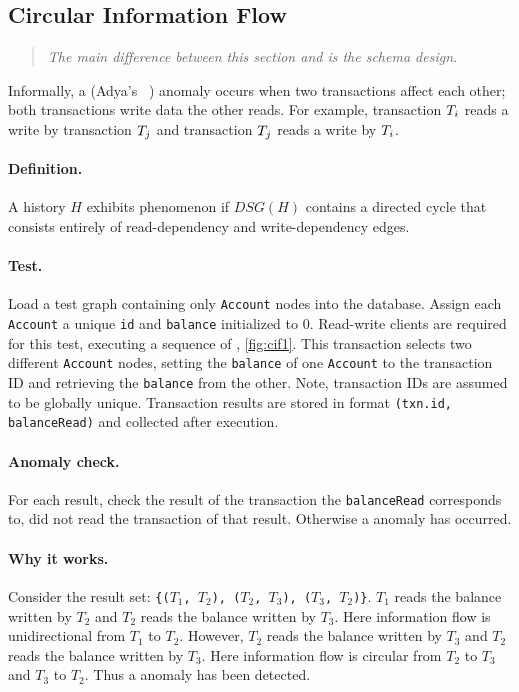 \subsection*{Circular Information Flow}

\begin{quote}
  \textit{The main difference between this section and \ldbcsnb\xspace
          is the schema design.
  }
\end{quote}

Informally, a  (Adya's ~\cite{adya1999weak})
anomaly occurs when two transactions affect each other; \ie both transactions
write data the other reads. For example, transaction $T_i$ reads a 
write by transaction $T_j$ and transaction $T_j$ reads a write by $T_i$.

\paragraph{Definition.}
A history $H$ exhibits phenomenon  if $\textit{DSG}(H)$ contains a 
directed cycle that consists entirely of read-dependency and write-dependency edges.

\paragraph{Test.}
Load a test graph containing only \texttt{Account} nodes into the database.
Assign each \texttt{Account} a unique \texttt{id} and \texttt{balance} 
initialized to 0. Read-write clients are required for this test, executing a 
sequence of , \autoref{fig:cif1}. This transaction 
selects two different \texttt{Account} nodes, setting the \texttt{balance} of 
one \texttt{Account} to the transaction ID and retrieving the \texttt{balance} 
from the other. Note, transaction IDs are assumed to be globally unique. 
Transaction results are stored in format \texttt{(txn.id, balanceRead)} and 
collected after execution.

\paragraph{Anomaly check.}
For each result, check the result of the transaction the \texttt{balanceRead} 
corresponds to, did not read the transaction of that result. Otherwise a 
 anomaly has occurred.

\paragraph{Why it works.}
Consider the result set:
\texttt{\{($T_\mathrm{1}$, $T_\mathrm{2}$), ($T_\mathrm{2}$, $T_\mathrm{3}$), 
($T_\mathrm{3}$, $T_\mathrm{2}$)\}}. $T_\mathrm{1}$ reads the balance written by
$T_\mathrm{2}$ and $T_\mathrm{2}$ reads the balance written by $T_\mathrm{3}$.
Here information flow is unidirectional from $T_\mathrm{1}$ to $T_\mathrm{2}$.
However, $T_\mathrm{2}$ reads the balance written by $T_\mathrm{3}$ and 
$T_\mathrm{2}$ reads the balance written by $T_\mathrm{3}$. Here information flow 
is circular from $T_\mathrm{2}$ to $T_\mathrm{3}$ and $T_\mathrm{3}$ to $T_\mathrm{2}$.
Thus a  anomaly has been detected.


